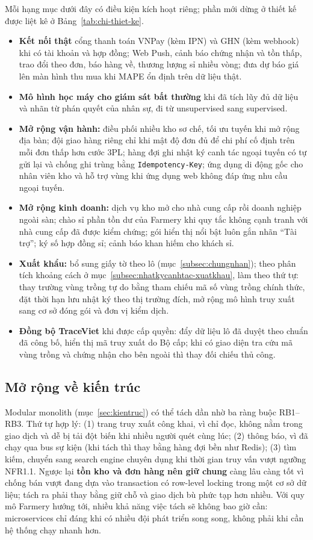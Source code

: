 Mỗi hạng mục dưới đây có điều kiện kích hoạt riêng; phần mới dừng ở thiết kế được liệt kê ở Bảng~\ref{tab:chi-thiet-ke}.
\begin{itemize}
    \item \textbf{Kết nối thật} cổng thanh toán VNPay (kèm IPN) và GHN (kèm webhook) khi có tài khoản và hợp đồng; Web Push, cảnh báo chứng nhận và tồn thấp, trao đổi theo đơn, báo hàng về, thương lượng sỉ nhiều vòng; đưa dự báo giá lên màn hình thu mua khi MAPE ổn định trên dữ liệu thật.
    \item \textbf{Mô hình học máy cho giám sát bất thường} khi đã tích lũy đủ dữ liệu và nhãn từ phán quyết của nhân sự, đi từ unsupervised sang supervised.
    \item \textbf{Mở rộng vận hành:} điều phối nhiều kho sơ chế, tối ưu tuyến khi mở rộng địa bàn; đội giao hàng riêng chỉ khi mật độ đơn đủ để chi phí cố định trên mỗi đơn thấp hơn cước 3PL; hàng đợi ghi nhật ký canh tác ngoại tuyến có tự gửi lại và chống ghi trùng bằng \texttt{Idempotency-Key}; ứng dụng di động gốc cho nhân viên kho và hỗ trợ vùng khi ứng dụng web không đáp ứng nhu cầu ngoại tuyến.
    \item \textbf{Mở rộng kinh doanh:} dịch vụ kho mở cho nhà cung cấp rồi doanh nghiệp ngoài sàn; chào sỉ phần tồn dư của Farmery khi quy tắc không cạnh tranh với nhà cung cấp đã được kiểm chứng; gói hiển thị nổi bật luôn gắn nhãn ``Tài trợ''; ký số hợp đồng sỉ; cảnh báo khan hiếm cho khách sỉ.
    \item \textbf{Xuất khẩu:} bổ sung giấy tờ theo lô (mục~\ref{subsec:chungnhan}); theo phân tích khoảng cách ở mục~\ref{subsec:nhatkycanhtac-xuatkhau}, làm theo thứ tự: thay trường vùng trồng tự do bằng tham chiếu mã số vùng trồng chính thức, đặt thời hạn lưu nhật ký theo thị trường đích, mở rộng mô hình truy xuất sang cơ sở đóng gói và đơn vị kiểm dịch.
    \item \textbf{Đồng bộ TraceViet} khi được cấp quyền: đẩy dữ liệu lô đã duyệt theo chuẩn đã công bố, hiển thị mã truy xuất do Bộ cấp; khi có giao diện tra cứu mã vùng trồng và chứng nhận cho bên ngoài thì thay đối chiếu thủ công.
\end{itemize}

\subsection{Mở rộng về kiến trúc}

Modular monolith (mục~\ref{sec:kientruc}) có thể tách dần nhờ ba ràng buộc RB1--RB3. Thứ tự hợp lý: (1) trang truy xuất công khai, vì chỉ đọc, không nằm trong giao dịch và dễ bị tải đột biến khi nhiều người quét cùng lúc; (2) thông báo, vì đã chạy qua bus sự kiện (khi tách thì thay bằng hàng đợi bền như Redis); (3) tìm kiếm, chuyển sang search engine chuyên dụng khi thời gian truy vấn vượt ngưỡng NFR1.1. Ngược lại \textbf{tồn kho và đơn hàng nên giữ chung} càng lâu càng tốt vì chống bán vượt đang dựa vào transaction có row-level locking trong một cơ sở dữ liệu; tách ra phải thay bằng giữ chỗ và giao dịch bù phức tạp hơn nhiều. Với quy mô Farmery hướng tới, nhiều khả năng việc tách sẽ không bao giờ cần: microservices chỉ đáng khi có nhiều đội phát triển song song, không phải khi cần hệ thống chạy nhanh hơn.
